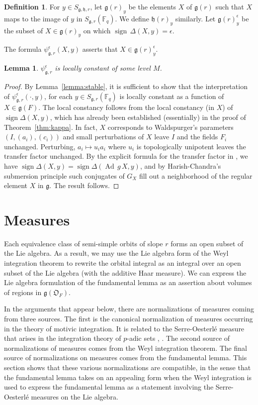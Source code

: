 \documentclass[11pt]{amsart}
\newtheorem{lemma}[theorem]{Lemma}
\theoremstyle{definition}
\newtheorem{definition}[theorem]{Definition}
\theoremstyle{remark}
\numberwithin{equation}{theorem}
\def\F{{F}}
\def\A{{\mathfrak{O}_\F}}
\def\f{{\mathbb{F}_q}}
\def\op#1{\operatorname{#1}}
\def\lie#1{{\mathfrak{#1}}}
\def\sign{\operatorname{sign}}
\begin{document}
\begin{definition} For $y\in S_{\lie{g},\lie{h},r}$, let
$\lie{g}(r)_y$ be the elements $X$ of $\lie{g}(r)$ such that $X$
maps to the image of $y$ in $S_{\lie{g},r}(\f)$.  We define
$\lie{h}(r)_y$ similarly.  Let $\lie{g}(r)^\epsilon_y$ be the
subset of $X\in \lie{g}(r)_y$ on which
$\sign\,\Delta(X,y)=\epsilon$.
\end{definition}

The formula $\psi_{\lie{g},r}^\epsilon(X,y)$ asserts that $X\in
\lie{g}(r)^\epsilon_y$.

\begin{lemma} \label{lemma:phi-stable}
$\psi_{\lie{g},r}^\epsilon$ is locally constant of some level $M$.
\end{lemma}

\begin{proof}  By Lemma~\ref{lemma:stable}, it is sufficient to show
that the interpretation of $\psi^\epsilon_{\lie{g},r}(\cdot,y)$,
for each $y\in S_{\lie{g},r}(\f)$ is locally constant as a
function of $X\in \lie{g}(F)$. The local constancy follows from
the local constancy (in $X$) of $\sign\Delta(X,y)$, which has
already been established (essentially) in the proof of
Theorem~\ref{thm:kappa}. In fact, $X$ corresponds to Waldspurger's
parameters $(I,(a_i),(c_i))$ and small perturbations of $X$ leave
$I$ and the fields $F_i$ unchanged.  Perturbing, $a_i\mapsto u_i
a_i$ where $u_i$ is topologically unipotent leaves the transfer
factor unchanged.  By the explicit formula for the transfer factor
in \cite{WA}, we have $\sign\Delta(X,y) = \sign\Delta(\op{Ad}\,g\,
X,y)$, and by Harish-Chandra's submersion principle such
conjugates of $G_X$ fill out a neighborhood of the regular element
$X$ in $\lie{g}$. The result follows.
\end{proof}

\section{Measures}

Each equivalence class of semi-simple orbits of slope $r$ forms an
open subset of the Lie algebra.  As a result, we may use the Lie
algebra form of the Weyl integration theorem to rewrite the
orbital integral as an integral over an open subset of the Lie
algebra (with the additive Haar measure).    We can express the
Lie algebra formulation of the fundamental lemma as an assertion
about volumes of regions in $\lie{g}(\A)$.


In the arguments that appear below, there are normalizations of
measures coming from three sources.  The first is the canonical
normalization of measures occurring in the theory of motivic
integration.  It is related to the Serre-Oesterl\'e measure that
arises in the integration theory of $p$-adic sets \cite{S},
\cite{O}. The second source of normalizations of measures comes
from the Weyl integration theorem.  The final source of
normalizations on measures comes from the fundamental lemma.  This
section shows that these various normalizations are compatible, in
the sense that the fundamental lemma takes on an appealing form
when the Weyl integration is used to express the fundamental lemma
as a statement involving the Serre-Oesterl\'e measures on the Lie
algebra.
\end{document}
